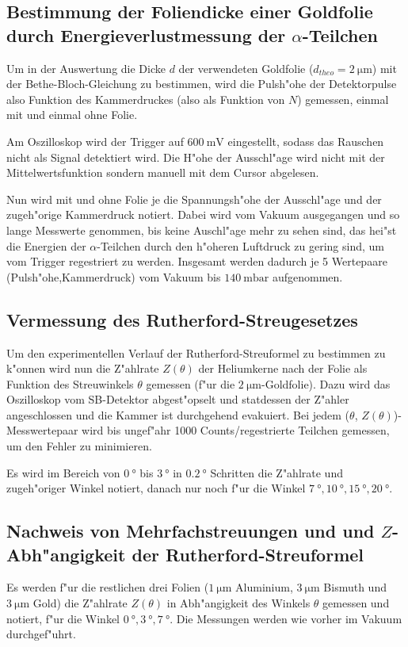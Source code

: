   \subsection{\texorpdfstring{Bestimmung der Foliendicke einer Goldfolie durch Energieverlustmessung der $\alpha$-Teilchen}{Bestimmung der Foliendicke einer Goldfolie durch Energieverlustmessung der alpha-Teilchen}}
    Um in der Auswertung die Dicke $d$ der verwendeten Goldfolie ($d_{theo}=\SI{2}{\micro \meter}$) mit der Bethe-Bloch-Gleichung zu bestimmen, wird die Pulsh"ohe der Detektorpulse also Funktion des Kammerdruckes (also als Funktion von $N$) gemessen, einmal mit und einmal ohne Folie.

    Am Oszilloskop wird der Trigger auf $\SI{600}{\milli \volt}$ eingestellt, sodass das Rauschen nicht als Signal detektiert wird.
    Die H"ohe der Ausschl"age wird nicht mit der Mittelwertsfunktion sondern manuell mit dem Cursor abgelesen.

    Nun wird mit und ohne Folie je die Spannungsh"ohe der Ausschl"age und der zugeh"orige Kammerdruck notiert.
    Dabei wird vom Vakuum ausgegangen und so lange Messwerte genommen, bis keine Auschl"age mehr zu sehen sind, das hei"st die Energien der $\alpha$-Teilchen durch den h"oheren Luftdruck zu gering sind, um vom Trigger regestriert zu werden.
    Insgesamt werden dadurch je 5 Wertepaare (Pulsh"ohe,Kammerdruck) vom Vakuum bis $\SI{140}{\milli \bar}$ aufgenommen.




  \subsection{Vermessung des Rutherford-Streugesetzes}
    Um den experimentellen Verlauf der Rutherford-Streuformel zu bestimmen zu k"onnen wird nun die Z"ahlrate $Z(\theta)$ der Heliumkerne nach der Folie als Funktion des Streuwinkels $\theta$ gemessen (f"ur die $\SI{2}{\micro \meter}$-Goldfolie).
    Dazu wird das Oszilloskop vom SB-Detektor abgest"opselt und statdessen der Z"ahler angeschlossen und die Kammer ist durchgehend evakuiert.
    Bei jedem ($\theta$, $Z(\theta)$)-Messwertepaar wird bis ungef"ahr 1000 Counts/regestrierte Teilchen gemessen, um den Fehler zu minimieren.

    Es wird im Bereich von $\SI{0}{\degree}$ bis $\SI{3}{\degree}$ in $\SI{0,2}{\degree}$ Schritten die Z"ahlrate und zugeh"origer Winkel notiert, danach nur noch f"ur die Winkel $\SI{7}{\degree},\SI{10}{\degree},\SI{15}{\degree},\SI{20}{\degree}$.


  \subsection{Nachweis von Mehrfachstreuungen und und $Z$-Abh"angigkeit der Rutherford-Streuformel}
    Es werden f"ur die restlichen drei Folien ($\SI{1}{\micro \meter}$ Aluminium, $\SI{3}{\micro \meter}$ Bismuth und $\SI{3}{\micro \meter}$ Gold) die Z"ahlrate $Z(\theta)$ in Abh"angigkeit des Winkels $\theta$ gemessen und notiert, f"ur die Winkel $\SI{0}{\degree},\SI{3}{\degree},\SI{7}{\degree}$.
    Die Messungen werden wie vorher im Vakuum durchgef"uhrt.
